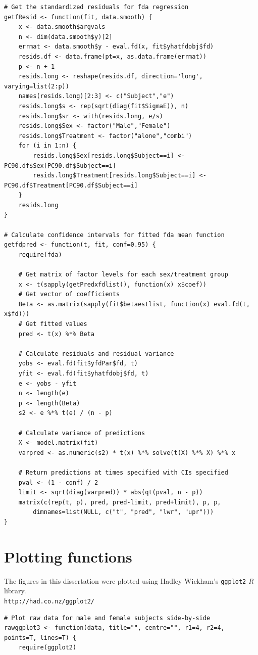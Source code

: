 \begin{singlespace}
\begin{lstlisting}[caption=Functions to calculate fda regression standardized residuals and confidence intervals for fitted values,label=R:fdaresid]
# Get the standardized residuals for fda regression
getfResid <- function(fit, data.smooth) {
	x <- data.smooth$argvals
	n <- dim(data.smooth$y)[2]
	errmat <- data.smooth$y - eval.fd(x, fit$yhatfdobj$fd)
	resids.df <- data.frame(pt=x, as.data.frame(errmat))
	p <- n + 1
	resids.long <- reshape(resids.df, direction='long', varying=list(2:p))
	names(resids.long)[2:3] <- c("Subject","e")
	resids.long$s <- rep(sqrt(diag(fit$SigmaE)), n)
	resids.long$sr <- with(resids.long, e/s)
	resids.long$Sex <- factor("Male","Female")
	resids.long$Treatment <- factor("alone","combi")
	for (i in 1:n) {
		resids.long$Sex[resids.long$Subject==i] <- PC90.df$Sex[PC90.df$Subject==i]
		resids.long$Treatment[resids.long$Subject==i] <- PC90.df$Treatment[PC90.df$Subject==i]
	}
	resids.long
}

# Calculate confidence intervals for fitted fda mean function
getfdpred <- function(t, fit, conf=0.95) {
	require(fda)

	# Get matrix of factor levels for each sex/treatment group
	x <- t(sapply(getPredxfdlist(), function(x) x$coef))
	# Get vector of coefficients
	Beta <- as.matrix(sapply(fit$betaestlist, function(x) eval.fd(t, x$fd)))
	# Get fitted values
	pred <- t(x) %*% Beta

	# Calculate residuals and residual variance
	yobs <- eval.fd(fit$yfdPar$fd, t)
	yfit <- eval.fd(fit$yhatfdobj$fd, t)
	e <- yobs - yfit
	n <- length(e)
	p <- length(Beta)
	s2 <- e %*% t(e) / (n - p)

	# Calculate variance of predictions
	X <- model.matrix(fit)
	varpred <- as.numeric(s2) * t(x) %*% solve(t(X) %*% X) %*% x

	# Return predictions at times specified with CIs specified
	pval <- (1 - conf) / 2
	limit <- sqrt(diag(varpred)) * abs(qt(pval, n - p))
	matrix(c(rep(t, p), pred, pred-limit, pred+limit), p, p,
		dimnames=list(NULL, c("t", "pred", "lwr", "upr")))
}
\end{lstlisting}

\section{Plotting functions}
The figures in this dissertation were plotted using Hadley Wickham's \texttt{ggplot2} \emph{R} library.\\
\texttt{http://had.co.nz/ggplot2/}
\begin{lstlisting}[caption=Plot raw count data for male and female subjects side-by-side,label=R:rawggplot]
# Plot raw data for male and female subjects side-by-side
rawggplot3 <- function(data, title="", centre="", r1=4, r2=4, points=T, lines=T) {
	require(ggplot2)


\end{lstlisting}
\end{singlespace}
